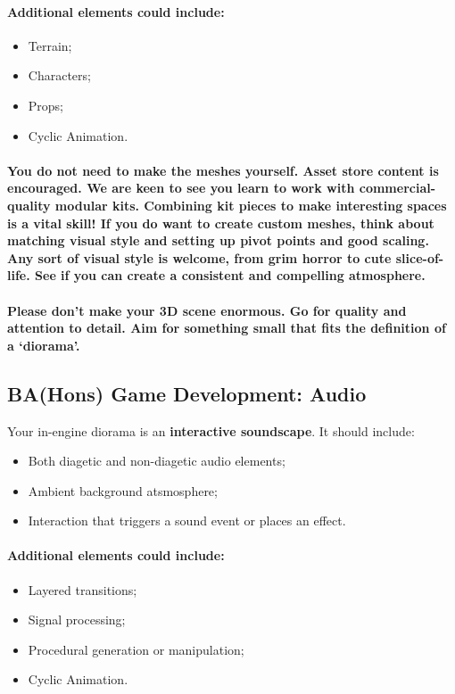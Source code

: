 \documentclass{../../fal_assignment}
\begin{document}
\paragraph{Additional elements could include:}
\begin{itemize}
\item Terrain;
\item Characters;
\item Props; 
\item Cyclic Animation.
\end{itemize}
\paragraph{You do not need to make the meshes yourself. Asset store content is encouraged. We are keen to see you learn to work with commercial-quality modular kits. Combining kit pieces to make interesting spaces is a vital skill! If you do want to create custom meshes, think about matching visual style and setting up pivot points and good scaling. Any sort of visual style is welcome, from grim horror to cute slice-of-life. See if you can create a consistent and compelling atmosphere.}

\paragraph{Please don’t make your 3D scene enormous. Go for quality and attention to detail. Aim for something small that fits the definition of a ‘diorama’.}

\subsection*{BA(Hons) Game Development: Audio}

Your in-engine diorama is an \textbf{interactive soundscape}. It should include:
\begin{itemize}
\item Both diagetic and non-diagetic audio elements;
\item Ambient background atsmosphere; 
\item Interaction that triggers a sound event or places an effect.
\end{itemize}
\paragraph{Additional elements could include:}
\begin{itemize}
\item Layered transitions;
\item Signal processing;
\item Procedural generation or manipulation; 
\item Cyclic Animation.
\end{itemize}
\end{document}
